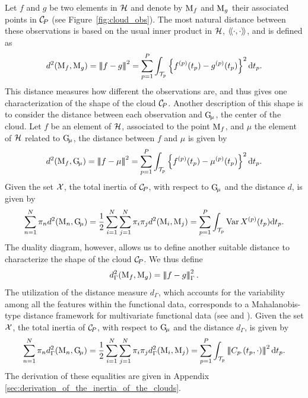 Let $f$ and $g$ be two elements in $\mathcal{H}$ and denote by $\mathrm{M}_f$ and $\mathrm{M}_g$ their associated points in $\mathcal{C}_{\!P}$ (see Figure~\ref{fig:cloud_obs}). The most natural distance between these observations is based on the usual inner product in $\mathcal{H}$, $\langle\!\langle\cdot, \cdot\rangle\!\rangle$, and is defined as
\begin{equation}\label{eq:distance_obs}
    d^2(\mathrm{M}_f, \mathrm{M}_g) = \left|\!\left|\!\left|f - g\right|\!\right|\!\right|^2 = \sum_{p = 1}^P \int_{\mathcal{T}_{p}}\left\{f^{(p)}(t_p) - g^{(p)}(t_p)\right\}^2 {\rm d} t_p.
\end{equation}
This distance measures how different the observations are, and thus gives one characterization of the shape of the cloud $\mathcal{C}_{\!P}$. Another description of this shape is to consider the distance between each observation and $\mathrm{G}_{\!\mu}$, the center of the cloud. Let $f$ be an element of $\mathcal{H}$, associated to the point $\mathrm{M}_f$, and $\mu$ the element of $\mathcal{H}$ related to $\mathrm{G}_{\!\mu}$, the distance between $f$ and $\mu$ is given by
\begin{equation}\label{eq:distance_center}
    d^2(\mathrm{M}_f, \mathrm{G}_{\!\mu}) = \left|\!\left|\!\left|f - \mu\right|\!\right|\!\right|^2 = \sum_{p = 1}^P \int_{\mathcal{T}_{p}}\left\{f^{(p)}(t_p) - \mu^{(p)}(t_p)\right\}^2 {\rm d} t_p.
\end{equation}
Given the set $\mathcal{X}$, the total inertia of $\mathcal{C}_{\!P}$, with respect to $\mathrm{G}_{\!\mu}$ and the distance $d$, is given by
\begin{equation}\label{eq:inertia}
    \sum_{n = 1}^N \pi_n d^2(\mathrm{M}_n, \mathrm{G}_{\!\mu}) = \frac{1}{2}\sum_{i = 1}^N \sum_{j = 1}^N \pi_i \pi_j d^2(\mathrm{M}_i, \mathrm{M}_j) = \sum_{p = 1}^P \int_{\mathcal{T}_{p}}\operatorname{Var}{X^{(p)}(t_p)} {\rm d} t_p.
\end{equation}
The duality diagram, however, allows us to define another suitable distance to characterize the shape of the cloud $\mathcal{C}_{\!P}$. We thus define
\begin{equation}
    d^2_\Gamma(\mathrm{M}_f, \mathrm{M}_g) = \left|\!\left|\!\left|f - g\right|\!\right|\!\right|_\Gamma^2.
\end{equation}
The utilization of the distance measure $d_\Gamma$, which accounts for the variability among all the features within the functional data, corresponds to a Mahalanobis-type distance framework for multivariate functional data (see \cite{berrenderoMahalanobisDistanceFunctional2020} and \cite{martinoKmeansProcedureBased2019}).
Given the set $\mathcal{X}$, the total inertia of $\mathcal{C}_{\!P}$, with respect to $\mathrm{G}_{\!\mu}$ and the distance $d_\Gamma$, is given by
\begin{equation}\label{eq:inertia_CP}
    \sum_{n = 1}^N \pi_n d_\Gamma^2(\mathrm{M}_n, \mathrm{G}_{\!\mu}) = \frac{1}{2}\sum_{i = 1}^N \sum_{j = 1}^N \pi_i \pi_j d_\Gamma^2(\mathrm{M}_i, \mathrm{M}_j) = \sum_{p = 1}^P \int_{\mathcal{T}_{p}} \left|\!\left|\!\left|C_{p \cdot}(t_p, \cdot)\right|\!\right|\!\right|^2 {\rm d} t_p.
\end{equation}
The derivation of these equalities are given in Appendix \ref{sec:derivation_of_the_inertia_of_the_clouds}.

